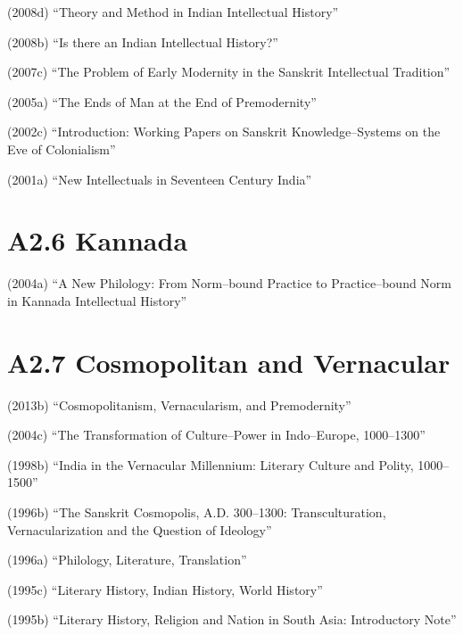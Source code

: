 \item (2008d) “Theory and Method in Indian Intellectual History”

 \item (2008b) “Is there an Indian Intellectual History?”

 \item (2007c) “The Problem of Early Modernity in the Sanskrit Intellectual Tradition”

 \item (2005a) “The Ends of Man at the End of Premodernity”

 \item (2002c) “Introduction: Working Papers on Sanskrit Knowledge–Systems on the Eve of Colonialism”

 \item (2001a) “New Intellectuals in Seventeen Century India”



\section*{A2.6 Kannada}

(2004a) “A New Philology: From Norm–bound Practice to Practice–bound Norm in Kannada Intellectual History”


\section*{A2.7 Cosmopolitan and Vernacular}

\item (2013b) “Cosmopolitanism, Vernacularism, and Premodernity”

 \item (2004c) “The Transformation of Culture–Power in Indo–Europe, 1000–1300”

 \item (1998b) “India in the Vernacular Millennium: Literary Culture and Polity, 1000–1500”

 \item (1996b) “The Sanskrit Cosmopolis, A.D. 300–1300: Transculturation, Vernacularization and the Question of Ideology”

 \item (1996a) “Philology, Literature, Translation”

 \item (1995c) “Literary History, Indian History, World History”

 \item (1995b) “Literary History, Religion and Nation in South Asia: Introductory Note”



